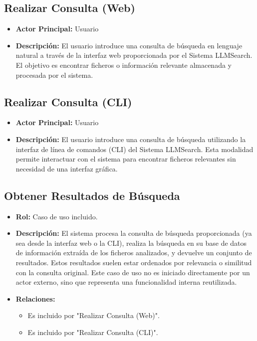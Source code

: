 \subsection{Realizar Consulta (Web)}
\begin{itemize}
\item \textbf{Actor Principal:} Usuario
\item \textbf{Descripción:} El usuario introduce una consulta de búsqueda en lenguaje natural a través de la interfaz web proporcionada por el Sistema LLMSearch. El objetivo es encontrar ficheros o información relevante almacenada y procesada por el sistema.
\end{itemize}

\subsection{Realizar Consulta (CLI)}
\begin{itemize}
\item \textbf{Actor Principal:} Usuario
\item \textbf{Descripción:} El usuario introduce una consulta de búsqueda utilizando la interfaz de línea de comandos (CLI) del Sistema LLMSearch. Esta modalidad permite interactuar con el sistema para encontrar ficheros relevantes sin necesidad de una interfaz gráfica.
\end{itemize}

\subsection{Obtener Resultados de Búsqueda}
\begin{itemize}
\item \textbf{Rol:} Caso de uso incluido.
\item \textbf{Descripción:} El sistema procesa la consulta de búsqueda proporcionada (ya sea desde la interfaz web o la CLI), realiza la búsqueda en su base de datos de información extraída de los ficheros analizados, y devuelve un conjunto de resultados. Estos resultados suelen estar ordenados por relevancia o similitud con la consulta original. Este caso de uso no es iniciado directamente por un actor externo, sino que representa una funcionalidad interna reutilizada.
\item \textbf{Relaciones:}
\begin{itemize}
\item Es incluido por "Realizar Consulta (Web)".
\item Es incluido por "Realizar Consulta (CLI)".
\end{itemize}
\end{itemize}

